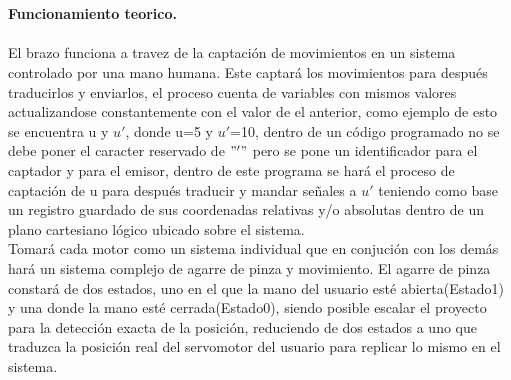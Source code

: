 \documentclass[letterpaper]{article}
\begin{document}
\\\\
\begin{large}
\textbf{Funcionamiento teorico.}\\\\
El brazo funciona a travez de la captación de movimientos en un sistema controlado por una mano humana. Este captará los movimientos para después traducirlos y enviarlos, el proceso cuenta de variables con mismos valores actualizandose constantemente con el valor de el anterior, como ejemplo de esto se encuentra u y $u'$, donde u=5 y $u'$=10, dentro de un código programado no se debe poner el caracter reservado de $" ' "$ pero se pone un identificador para el captador y para el emisor, dentro de este programa se hará el proceso de captación de u para después traducir y mandar señales a $u'$ teniendo como base un registro guardado de sus coordenadas relativas y/o absolutas dentro de un plano cartesiano lógico ubicado sobre el sistema. \\
Tomará cada motor como un sistema individual que en conjución con los demás hará un sistema complejo de agarre de pinza y movimiento. El agarre de pinza constará de dos estados, uno en el que la mano del usuario esté abierta(Estado1) y una donde la mano esté cerrada(Estado0), siendo posible escalar el proyecto para la detección exacta de la posición, reduciendo de dos estados a uno que traduzca la posición real del servomotor del usuario para replicar lo mismo en el sistema.
\\
\end{large}
\newpage
\end{document}
